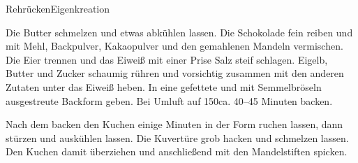 \begin{recipe}{Rehrücken}{Eigenkreation}\label{Rehruecken}
  \inglist

  \steps

  Die Butter schmelzen und etwas abkühlen lassen. Die Schokolade fein reiben
  und mit Mehl, Backpulver, Kakaopulver und den gemahlenen Mandeln
  vermischen. Die Eier trennen und das Eiweiß mit einer Prise Salz steif
  schlagen. Eigelb, Butter und Zucker schaumig rühren und vorsichtig zusammen
  mit den anderen Zutaten unter das Eiweiß heben. In eine gefettete und mit
  Semmelbröseln ausgestreute Backform geben. Bei Umluft auf 150\celsius ca.
  40--45 Minuten backen.
  
  Nach dem backen den Kuchen einige Minuten in der Form ruchen lassen, dann
  stürzen und auskühlen lassen. Die Kuvertüre grob hacken und schmelzen
  lassen. Den Kuchen damit überziehen und anschließend mit den Mandelstiften
  spicken.
  
\end{recipe}
